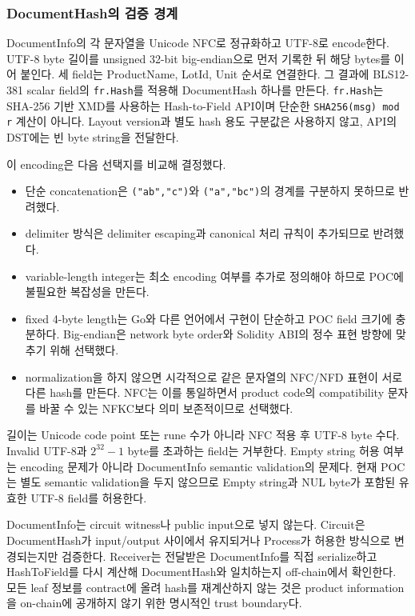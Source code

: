 \documentclass[11pt]{extarticle}
\begin{document}
\subsubsection{DocumentHash의 검증 경계}

DocumentInfo의 각 문자열을 Unicode NFC로 정규화하고 UTF-8로 encode한다. UTF-8
byte 길이를 unsigned 32-bit big-endian으로 먼저 기록한 뒤 해당 bytes를 이어 붙인다.
세 field는 ProductName, LotId, Unit 순서로 연결한다. 그 결과에 BLS12-381 scalar
field의 \texttt{fr.Hash}를 적용해 DocumentHash 하나를 만든다. \texttt{fr.Hash}는
SHA-256 기반 XMD를 사용하는 Hash-to-Field API이며 단순한
\texttt{SHA256(msg) mod r} 계산이 아니다. Layout version과 별도 hash 용도 구분값은
사용하지 않고, API의 DST에는 빈 byte string을 전달한다.

이 encoding은 다음 선택지를 비교해 결정했다.

\begin{itemize}
  \item 단순 concatenation은 \texttt{("ab","c")}와 \texttt{("a","bc")}의
        경계를 구분하지 못하므로 반려했다.
  \item delimiter 방식은 delimiter escaping과 canonical 처리 규칙이 추가되므로
        반려했다.
  \item variable-length integer는 최소 encoding 여부를 추가로 정의해야 하므로 POC에
        불필요한 복잡성을 만든다.
  \item fixed 4-byte length는 Go와 다른 언어에서 구현이 단순하고 POC field 크기에
        충분하다. Big-endian은 network byte order와 Solidity ABI의 정수 표현 방향에
        맞추기 위해 선택했다.
  \item normalization을 하지 않으면 시각적으로 같은 문자열의 NFC/NFD 표현이 서로
        다른 hash를 만든다. NFC는 이를 통일하면서 product code의 compatibility 문자를
        바꿀 수 있는 NFKC보다 의미 보존적이므로 선택했다.
\end{itemize}

길이는 Unicode code point 또는 rune 수가 아니라 NFC 적용 후 UTF-8 byte 수다. Invalid
UTF-8과 $2^{32}-1$ byte를 초과하는 field는 거부한다. Empty string 허용 여부는 encoding
문제가 아니라 DocumentInfo semantic validation의 문제다. 현재 POC는 별도 semantic
validation을 두지 않으므로 Empty string과 NUL byte가 포함된 유효한 UTF-8 field를 허용한다.

DocumentInfo는 circuit witness나 public input으로 넣지 않는다. Circuit은
DocumentHash가 input/output 사이에서 유지되거나 Process가 허용한 방식으로 변경되는지만
검증한다. Receiver는 전달받은 DocumentInfo를 직접 serialize하고 HashToField를 다시
계산해 DocumentHash와 일치하는지 off-chain에서 확인한다. 모든 leaf 정보를 contract에
올려 hash를 재계산하지 않는 것은 product information을 on-chain에 공개하지 않기 위한
명시적인 trust boundary다.
\end{document}
